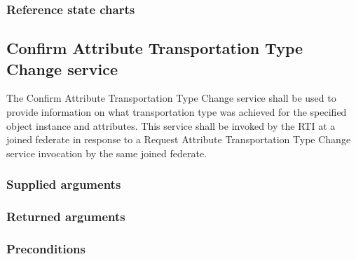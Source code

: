 \begin{compactstdpage}

    \subsubsection{Reference state charts}



    \subsection{Confirm Attribute Transportation Type Change \rtiinitiated{} service}


    The Confirm Attribute Transportation Type Change \rtiinitiated{} service shall be used to provide information on what transportation type was achieved for the specified object instance and attributes. This service shall be invoked by the RTI at a joined federate in response to a Request Attribute Transportation Type Change service invocation by the same joined federate.

    \subsubsection{Supplied arguments}



    \subsubsection{Returned arguments}



    \subsubsection{Preconditions}




\end{compactstdpage}
